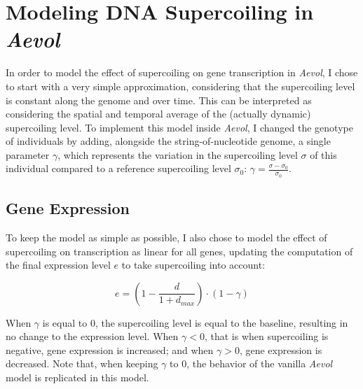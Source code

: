 \section{Modeling DNA Supercoiling in \emph{Aevol}}

In order to model the effect of supercoiling on gene transcription in \emph{Aevol}, I chose to start with a very simple approximation, considering that the supercoiling level is constant along the genome and over time.
This can be interpreted as considering the spatial and temporal average of the (actually dynamic) supercoiling level.
To implement this model inside \emph{Aevol}, I changed the genotype of individuals by adding, alongside the string-of-nucleotide genome, a single parameter $\gamma$, which represents the variation in the supercoiling level $\sigma$ of this individual compared to a reference supercoiling level $\sigma_0$: $\gamma = \frac{\sigma-\sigma_0}{\sigma_0}$.

\subsection{Gene Expression}
To keep the model as simple as possible, I also chose to model the effect of supercoiling on transcription as linear for all genes, updating the computation of the final expression level $e$ to take supercoiling into account:

\begin{equation}
e = (1 - \frac{d}{1+d_{max}}) \cdot (1 - \gamma)
\label{eq:aevol:sc}
\end{equation}

When $\gamma$ is equal to 0, the supercoiling level is equal to the baseline, resulting in no change to the expression level.
When $\gamma < 0$, that is when supercoiling is negative, gene expression is increased; and when $\gamma > 0$, gene expression is decreased.
Note that, when keeping $\gamma$ to 0, the behavior of the vanilla \emph{Aevol} model is replicated in this model.

